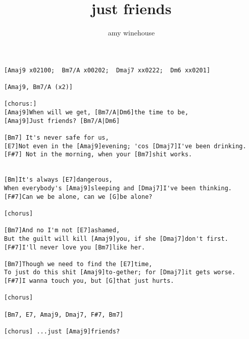 \author{amy winehouse}
\title{just friends}
\maketitle
\begin{verbatim}
[Amaj9 x02100;  Bm7/A x00202;  Dmaj7 xx0222;  Dm6 xx0201]

[Amaj9, Bm7/A (x2)]

[chorus:]
[Amaj9]When will we get, [Bm7/A|Dm6]the time to be,
[Amaj9]Just friends? [Bm7/A|Dm6]

[Bm7] It's never safe for us,
[E7]Not even in the [Amaj9]evening; 'cos [Dmaj7]I've been drinking.
[F#7] Not in the morning, when your [Bm7]shit works.

                     
[Bm]It's always [E7]dangerous,
When everybody's [Amaj9]sleeping and [Dmaj7]I've been thinking.
[F#7]Can we be alone, can we [G]be alone?

[chorus]

[Bm7]And no I'm not [E7]ashamed,
But the guilt will kill [Amaj9]you, if she [Dmaj7]don't first.
[F#7]I'll never love you [Bm7]like her.

[Bm7]Though we need to find the [E7]time,
To just do this shit [Amaj9]to-gether; for [Dmaj7]it gets worse.
[F#7]I wanna touch you, but [G]that just hurts.

[chorus]

[Bm7, E7, Amaj9, Dmaj7, F#7, Bm7]

[chorus] ...just [Amaj9]friends?
\end{verbatim}